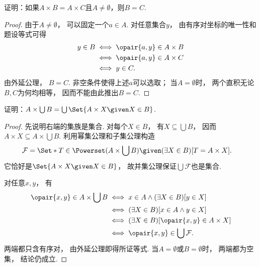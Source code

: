 \begin{example}
    证明：如果\(A \times B = A \times C\)且\(A \neq \emptyset\)，则\(B = C\).
    \begin{proof}
        由于\(A\neq\emptyset\)，
        可以固定一个\(a\in A\).
        对任意集合\(y\)，
        由有序对坐标的唯一性和题设等式可得
        \begin{align*}
            y\in B
            &\iff\opair{a,y}\in A\times B \\
            &\iff\opair{a,y}\in A\times C \\
            &\iff y\in C.
        \end{align*}
        由外延公理，
        \(B=C\).
        非空条件使得上述\(a\)可以选取；
        当\(A=\emptyset\)时，
        两个直积无论\(B,C\)为何均相等，
        因而不能由此推出\(B=C\).
    \end{proof}
\end{example}

\begin{example}
    证明：\(A \times \bigcup B = \bigcup\Set{ A \times X \given X \in B }\).
    \begin{proof}
        先说明右端的集族是集合.
        对每个\(X\in B\)，
        有\(X\subseteq\bigcup B\)，
        因而\(A\times X\subseteq A\times\bigcup B\).
        利用幂集公理和子集公理构造
        \begin{align*}
            \mathcal{F}
            &=\Set*{T\in\Powerset(A\times\bigcup B)
            \given(\exists X\in B)[T=A\times X]}.
        \end{align*}
        它恰好是\(\Set{A\times X\given X\in B}\)，
        故并集公理保证\(\bigcup\mathcal{F}\)也是集合.

        对任意\(x,y\)，
        有
        \begin{align*}
            \opair{x,y}\in A\times\bigcup B
            &\iff x\in A\land(\exists X\in B)[y\in X] \\
            &\iff(\exists X\in B)[x\in A\land y\in X] \\
            &\iff(\exists X\in B)[\opair{x,y}\in A\times X] \\
            &\iff\opair{x,y}\in\bigcup\mathcal{F}.
        \end{align*}
        两端都只含有序对，
        由外延公理即得所证等式.
        当\(A=\emptyset\)或\(B=\emptyset\)时，
        两端都为空集，
        结论仍成立.
    \end{proof}
\end{example}

